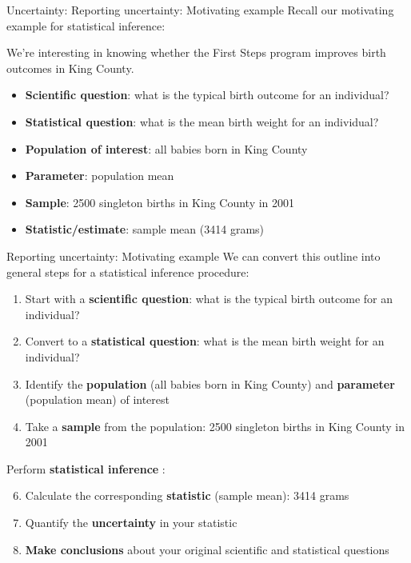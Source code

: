\documentclass[
  ignorenonframetext,
]{beamer}
\begin{document}
\begin{frame}{Uncertainty: Reporting uncertainty: Motivating example}
\protect\hypertarget{uncertainty-reporting-uncertainty-motivating-example}{}
Recall our motivating example for statistical inference:

We're interesting in knowing whether the First Steps program improves
birth outcomes in King County.

\begin{itemize}
\item
  \textbf{Scientific question}: what is the typical birth outcome for an
  individual?
\item
  \textbf{Statistical question}: what is the mean birth weight for an
  individual?
\item
  \textbf{Population of interest}: all babies born in King County
\item
  \textbf{Parameter}: population mean
\item
  \textbf{Sample}: 2500 singleton births in King County in 2001
\item
  \textbf{Statistic/estimate}: sample mean (3414 grams)
\end{itemize}
\end{frame}

\begin{frame}{Reporting uncertainty: Motivating example}
\protect\hypertarget{reporting-uncertainty-motivating-example}{}
We can convert this outline into general steps for a statistical
inference procedure:

\begin{enumerate}
\item
  Start with a \textbf{scientific question}: what is the typical birth
  outcome for an individual?
\item
  Convert to a \textbf{statistical question}: what is the mean birth
  weight for an individual?
\item
  Identify the \textbf{population} (all babies born in King County) and
  \textbf{parameter} (population mean) of interest
\item
  Take a \textbf{sample} from the population: 2500 singleton births in
  King County in 2001
\end{enumerate}

Perform \textbf{statistical inference} :

\begin{enumerate}
\setcounter{enumi}{5}
\item
  Calculate the corresponding \textbf{statistic} (sample mean): 3414
  grams
\item
  Quantify the \textbf{uncertainty} in your statistic
\item
  \textbf{Make conclusions} about your original scientific and
  statistical questions
\end{enumerate}
\end{frame}
\end{document}

